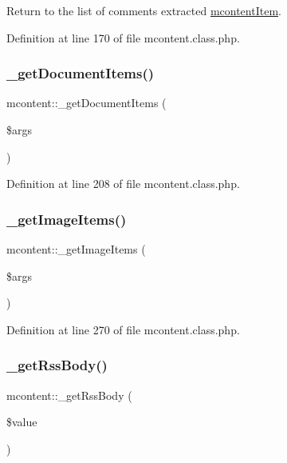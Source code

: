 Return to the list of comments extracted \hyperlink{classmcontentItem}{mcontent\+Item}. 



Definition at line 170 of file mcontent.\+class.\+php.

\mbox{\label{classmcontent_a6a6b96bd0a1ce21aab3a350c1584554a}} 
\subsubsection{\texorpdfstring{\+\_\+get\+Document\+Items()}{\_getDocumentItems()}}
{\footnotesize\ttfamily mcontent\+::\+\_\+get\+Document\+Items (\begin{DoxyParamCaption}\item[{}]{\$args }\end{DoxyParamCaption})}



Definition at line 208 of file mcontent.\+class.\+php.

\mbox{\label{classmcontent_ac6b1900f46d6b9cbc1c1513a90a63811}} 
\subsubsection{\texorpdfstring{\+\_\+get\+Image\+Items()}{\_getImageItems()}}
{\footnotesize\ttfamily mcontent\+::\+\_\+get\+Image\+Items (\begin{DoxyParamCaption}\item[{}]{\$args }\end{DoxyParamCaption})}



Definition at line 270 of file mcontent.\+class.\+php.

\mbox{\label{classmcontent_a5d41447024e60278f0cf46cea902da52}} 
\subsubsection{\texorpdfstring{\+\_\+get\+Rss\+Body()}{\_getRssBody()}}
{\footnotesize\ttfamily mcontent\+::\+\_\+get\+Rss\+Body (\begin{DoxyParamCaption}\item[{}]{\$value }\end{DoxyParamCaption})}



